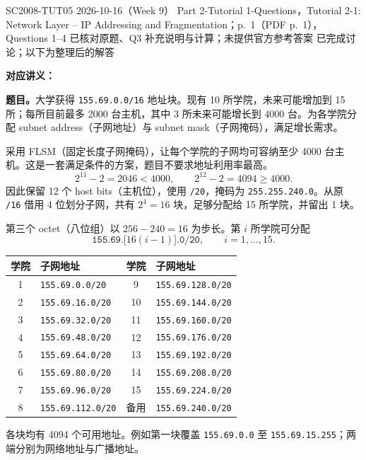 
\label{tutorial:SC2008-TUT05}

\tutorialmeta
  {SC2008-TUT05}
  {2026-10-16（Week 9）}
  {Part 2-Tutorial 1-Questions，Tutorial 2-1: Network Layer -- IP Addressing and Fragmentation；p.~1（PDF p.~1），Questions 1--4}
  {已核对原题、Q3 补充说明与计算；未提供官方参考答案}
  {已完成讨论；以下为整理后的解答}


\textbf{对应讲义：}

\textbf{题目。}大学获得 \texttt{155.69.0.0/16} 地址块。现有 10 所学院，未来可能增加到 15 所；每所目前最多 2000 台主机，其中 3 所未来可能增长到 4000 台。为各学院分配 subnet address（子网地址）与 subnet mask（子网掩码），满足增长需求。

\begin{checkedsolution}
采用 FLSM（固定长度子网掩码），让每个学院的子网均可容纳至少 4000 台主机。这是一套满足条件的方案，题目不要求地址利用率最高。
\[
  2^{11}-2=2046<4000,\qquad 2^{12}-2=4094\geq4000.
\]
因此保留 12 个 host bits（主机位），使用 \texttt{/20}，掩码为 \texttt{255.255.240.0}。从原 \texttt{/16} 借用 4 位划分子网，共有 $2^4=16$ 块，足够分配给 15 所学院，并留出 1 块。

第三个 octet（八位组）以 $256-240=16$ 为步长。第 $i$ 所学院可分配
\[
  \boxed{\texttt{155.69.}\bigl[16(i-1)\bigr]\texttt{.0/20}},\qquad i=1,\ldots,15.
\]
\begin{center}
\small
\begin{tabular}{@{}clcl@{}}
\toprule
学院 & 子网地址 & 学院 & 子网地址 \\
\midrule
1 & \texttt{155.69.0.0/20} & 9 & \texttt{155.69.128.0/20} \\
2 & \texttt{155.69.16.0/20} & 10 & \texttt{155.69.144.0/20} \\
3 & \texttt{155.69.32.0/20} & 11 & \texttt{155.69.160.0/20} \\
4 & \texttt{155.69.48.0/20} & 12 & \texttt{155.69.176.0/20} \\
5 & \texttt{155.69.64.0/20} & 13 & \texttt{155.69.192.0/20} \\
6 & \texttt{155.69.80.0/20} & 14 & \texttt{155.69.208.0/20} \\
7 & \texttt{155.69.96.0/20} & 15 & \texttt{155.69.224.0/20} \\
8 & \texttt{155.69.112.0/20} & 备用 & \texttt{155.69.240.0/20} \\
\bottomrule
\end{tabular}
\end{center}
各块均有 4094 个可用地址。例如第一块覆盖 \texttt{155.69.0.0} 至 \texttt{155.69.15.255}；两端分别为网络地址与广播地址。
\end{checkedsolution}

